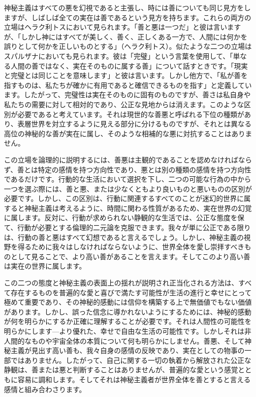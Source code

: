 \documentclass[a4paper,11pt,openany]{ltjsbook}
\begin{document}
神秘主義はすべての悪を幻視であると主張し、時には善についても同じ見方をしますが、しばしば全ての実在は善であるという見方を持ちます。これらの両方の立場はヘラク利トスにおいて見られます。「善と悪は一つだ」と彼は言いますが、「しかし神にはすべてが美しく、善く、正しくある一方で、人間には何かを誤りとして何かを正しいものとする」（ヘラク利トス）。似たような二つの立場はスパルザナにおいても見られます。彼は「完璧」という言葉を使用して、「単なる人間の善ではなく、実在そのものに属する善」について話すときです。「現実と完璧とは同じことを意味します」と彼は言います。しかし他方で、「私が善を指すものは、私たちが確かに有用であると確信できるものを指す」と定義しています。したがって、完璧性は実在そのものに固有のものですが、善さは私自身や私たちの需要に対して相対的であり、公正な見地からは消えます。このような区別が必要であると考えています。それは現世的な善悪と呼ばれる下位の種類があり、表層世界を対立するように見える部分に分けるものですが、それとは異なる高位の神秘的な善が実在に属し、そのような相補的な悪に対抗することはありません。

この立場を論理的に説明するには、善悪は主観的であることを認めなければならず、善とは特定の感情を持つ方向性であり、悪とは別の種類の感情を持つ方向性であるだけです。行動的な生活において選択を下し、二つの可能な行為の中から一つを選ぶ際には、善と悪、または少なくともより良いものと悪いものの区別が必要です。しかし、この区別は、行動に関連するすべてのことが迷幻的世界に属すると神秘主義は考えるように、時間に関わる性質があるため、実在世界の幻覚に属します。反対に、行動が求められない静観的な生活では、公正な態度を保て、行動が必要とする倫理的二元論を克服できます。我々が単に公正である限りは、行動の善と悪はすべて幻想であると言えるでしょう。しかし、神秘主義の視野を得るために我々はしなければならないように、世界全体を愛し崇拝すべきものとして見ることで、より高い善があることを言えます。そしてこのより高い善は実在の世界に属します。

この二つの態度と神秘主義の表面上の揺れが説明され正当化される方法は、すべて存在するものを普遍的な愛と喜びで満たす可能性が生活の進行と幸せにとって極めて重要であり、その神秘的感動には信仰を構築する上で無価値でもない価値があります。しかし、誤った信念に導かれないようにするためには、神秘的感動が何を明らかにするか正確に理解することが必要です。それは人間性の可能性を明らかにします—より優れた、幸せで自由な生活の可能性です。しかしそれは非人間的なものや宇宙全体の本質について何も明らかにしません。善悪、そして神秘主義が見出す高い善も、我々自身の感情の反映であり、実在としての物事の一部ではありません。したがって、自己に関する一切の執着から解放された公正な静観は、善または悪と判断することはありませんが、普遍的な愛という感覚とともに容易に調和します。そしてそれは神秘主義者が世界全体を善とすると言える感情と組み合わさります。
\end{document}
